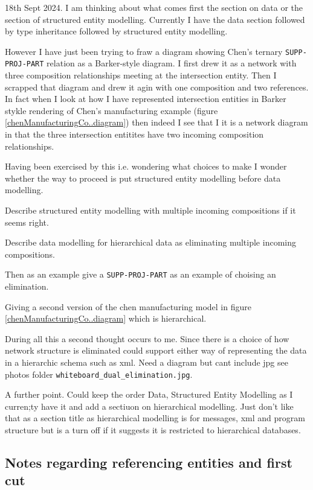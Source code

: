 \begin{noteforfuture}
18th Sept 2024. I am thinking about what comes first the section on data or the section of structured
entity modelling. 
Currently I have the data section followed by type inheritance followed by structured entity modelling. 

However I have just been trying to fraw a diagram showing Chen's ternary \verb'SUPP-PROJ-PART' relation as a Barker-style diagram. I first drew it as a network with three composition relationships meeting at the intersection entity. Then I scrapped that diagram and drew it agin with one composition and two references. In fact when I look at how I have represented intersection entities in Barker stykle rendering of Chen's manufacturing example (figure \ref{chenManufacturingCo..diagram}) then indeed I see that I it is a network diagram in that the three intersection entitites have two incoming composition relationships. 

Having been exercised by this i.e. wondering what choices to make I wonder whether the way to proceed is put structured entity modelling before data modelling.

Describe structured entity modelling with multiple incoming compositions if it seems right.

Describe data modelling for hierarchical data as eliminating multiple incoming compositions.

Then as an example give a \verb'SUPP-PROJ-PART' as an example of choising an elimination.

Giving a second version of the chen manufacturing model in figure \ref{chenManufacturingCo..diagram}
which is hierarchical.

During all this a second thought occurs to me. Since there is a choice of how network structure is eliminated could support either way of representing the data in a hierarchic schema such as xml.
 Need a diagram but cant include jpg see photos folder \verb'whiteboard_dual_elimination.jpg'.

A further point.
Could keep the order Data, Structured Entity Modelling as I curren;ty have it and add a sectiuon on hierarchical modelling. Just don't like that as a section title as hierarchical modelling is for messages, xml and program structure but is a turn off if it suggests it is restricted to hierarchical databases.

\end{noteforfuture}

\subsection{Notes regarding referencing entities and first cut}
